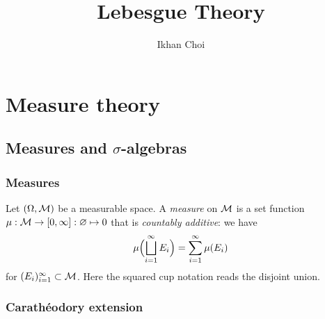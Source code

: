 \documentclass{../note}
\begin{document}
\title{Lebesgue Theory}
\author{Ikhan Choi}
\maketitle
\tableofcontents

\part{Measure theory}





\chapter{Measures and $\sigma$-algebras}


\section{Measures}

\begin{prb}
Let $(\Omega,\mathcal{M})$ be a measurable space.
A \emph{measure} on $\mathcal{M}$ is a set function $\mu:\mathcal{M}\to[0,\infty]:\varnothing\mapsto0$ that is \emph{countably additive}: we have
\[\mu\Bigl(\bigsqcup_{i=1}^\infty E_i\Bigr)=\sum_{i=1}^\infty\mu(E_i)\]
for $(E_i)_{i=1}^\infty\subset\mathcal{M}$.
Here the squared cup notation reads the disjoint union.
\end{prb}

\begin{prb}

\end{prb}

\section{Carath\'eodory extension}
\end{document}
